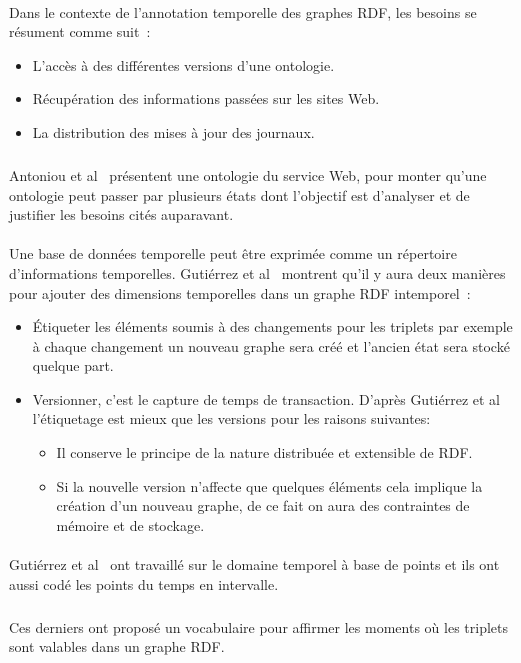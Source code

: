 \documentclass[12pt,a4]{report}
\begin{document}
\paragraph{}
Dans le contexte de l'annotation temporelle des graphes RDF, les besoins se résument comme suit~:
\begin{itemize}
\item L'accès à des différentes versions d’une ontologie.
\item Récupération des informations passées sur les sites Web.
\item La distribution des mises à jour des journaux.
\end{itemize}
\subparagraph{}
Antoniou et al~\cite{antoniou2004} présentent une ontologie du service Web, pour monter qu'une ontologie peut passer par plusieurs états dont l'objectif est d'analyser et de justifier les besoins cités auparavant.
\paragraph{}
Une base de données temporelle peut être exprimée comme un répertoire d'informations temporelles.
Gutiérrez et al~\cite{gutierrez2007} montrent qu'il y aura deux manières pour ajouter des dimensions temporelles dans un graphe RDF intemporel~:
\begin{itemize}
\item Étiqueter les éléments soumis à des changements pour les triplets par exemple à chaque changement un nouveau graphe sera créé et l’ancien état sera stocké quelque part.
\item Versionner, c'est le capture de temps de transaction. D'après Gutiérrez et al~\cite{gutierrez2007} l’étiquetage est mieux que les versions pour les raisons suivantes:
\begin{itemize}
\item Il conserve le principe de la nature distribuée et extensible de RDF.
\item Si la nouvelle version n’affecte que quelques éléments cela implique la création d’un nouveau graphe, de ce fait on aura des contraintes de mémoire et de stockage. 
\end{itemize}
\end{itemize}
\paragraph{}
Gutiérrez et al~\cite{gutierrez2007} ont travaillé sur le domaine temporel à base de points et ils ont aussi codé les points du temps en intervalle.
\subparagraph{}
Ces derniers ont proposé un vocabulaire pour affirmer les moments où les triplets sont valables dans un graphe RDF.
\end{document}
